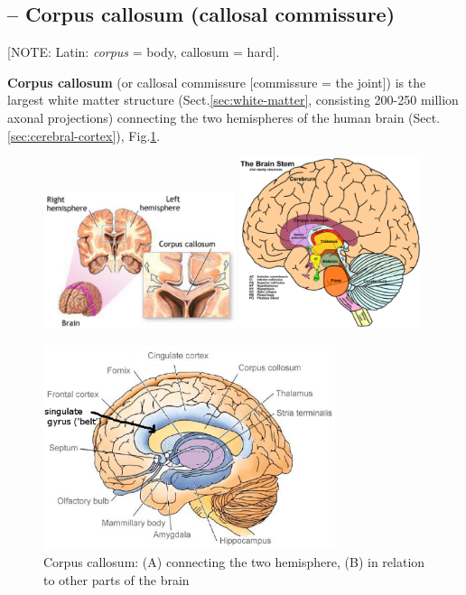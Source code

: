 \subsection{-- Corpus callosum (callosal commissure)}
\label{sec:corpus_callosum}
\label{sec:callosal-commissure}

[NOTE: Latin: {\it corpus} = body, callosum = hard].

{\bf Corpus callosum} (or callosal commissure [commissure = the joint]) is the
largest white matter structure (Sect.\ref{sec:white-matter}, consisting 200-250
million axonal projections) connecting the two hemispheres of the human brain
(Sect.\ref{sec:cerebral-cortex}), Fig.\ref{fig:corpus_callosum}.

\begin{figure}[hbt]
  \centerline{
  \includegraphics[height=4cm,
    angle=0]{./images/corpus_callosum_01.eps}
      \includegraphics[height=5cm,
    angle=0]{./images/corpus_callosum_02.eps}}
  \centerline{\includegraphics[height=6cm,
    angle=0]{./images/corpus_callosum_03.eps}}
\caption{Corpus callosum: (A) connecting the two hemisphere, (B) in relation to
other parts of the brain}
\label{fig:corpus_callosum}
\end{figure}



